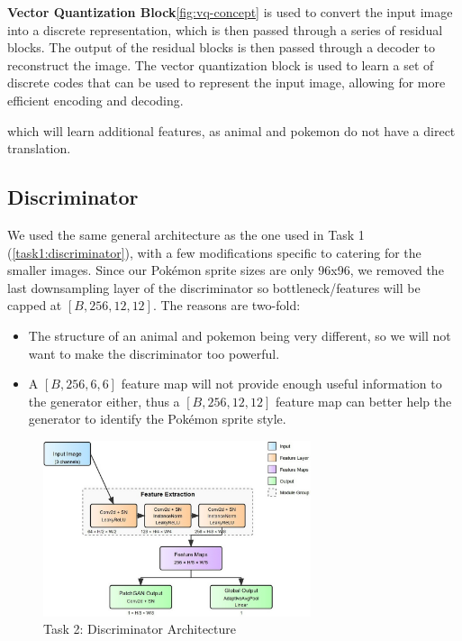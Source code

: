 \documentclass[twoside,english,notitlepage]{report}
\begin{document}
\textbf{Vector Quantization Block}\ref{fig:vq-concept} is used to convert the input image into a discrete representation, which is then passed through a series of residual blocks. The output of the residual blocks is then passed through a decoder to reconstruct the image. The vector quantization block is used to learn a set of discrete codes that can be used to represent the input image, allowing for more efficient encoding and decoding. 

which will learn additional features, as animal and pokemon do not have a direct translation.



\subsection{Discriminator}\label{task2:discriminator}
We used the same general architecture as the one used in Task 1 (\ref{task1:discriminator}), with a few modifications specific to catering for the smaller images. Since our Pokémon sprite sizes are only 96x96, we removed the last downsampling layer of the discriminator so bottleneck/features will be capped at $[B, 256, 12, 12]$.
\noindent The reasons are two-fold: 

\begin{itemize}
    \item The structure of an animal and pokemon being very different, so we will not want to make the discriminator too powerful. 
    \item A $[B, 256, 6, 6]$ feature map will not provide enough useful information to the generator either, thus a $[B, 256, 12, 12]$ feature map can better help the generator to identify the Pokémon sprite style.
\end{itemize}


\begin{figure}[h]
    \centering
    \includegraphics[width=0.7\textwidth]{task2/discriminatorArchitecture.jpg}
    \caption{Task 2: Discriminator Architecture}
\end{figure}
\end{document}
